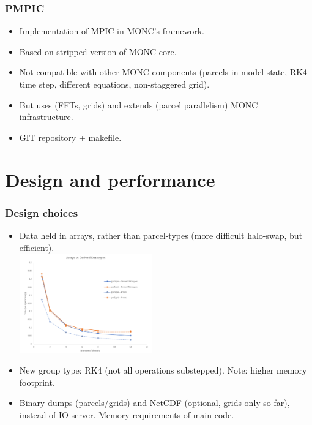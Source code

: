 \documentclass{beamer}
\begin{document}
\begin{frame}
\frametitle{PMPIC}
\begin{itemize}
\item Implementation of MPIC in MONC's framework.
\item Based on stripped version of MONC core.
\item Not compatible with other MONC components (parcels in model state, RK4 time step, different equations, non-staggered grid).
\item But uses (FFTs, grids) and extends (parcel parallelism) MONC infrastructure.
\item GIT repository + makefile.
\end{itemize}
\end{frame}

\section{Design and performance}

\begin{frame}
\frametitle{Design choices}
\begin{itemize}
\item Data held in arrays, rather than parcel-types (more difficult halo-swap, but efficient). \\
\includegraphics[width=0.45\textwidth]{pmpic_images/grid2par.png} 
\item New group type: RK4 (not all operations substepped). Note: higher memory footprint.
\item Binary dumps (parcels/grids) and NetCDF (optional, grids only so far), instead of IO-server. Memory requirements of main code.
\end{itemize}

\end{frame}
\end{document}
